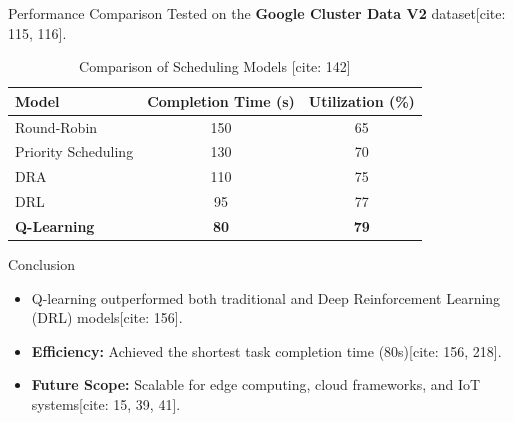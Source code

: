 \documentclass{beamer}
\begin{document}
\begin{frame}{Performance Comparison}
    Tested on the \textbf{Google Cluster Data V2} dataset[cite: 115, 116].
    \begin{table}
        \centering
        \begin{tabular}{|l|c|c|}
            \hline
            \textbf{Model} & \textbf{Completion Time (s)} & \textbf{Utilization (\%)} \\
            \hline
            Round-Robin & 150 & 65 \\
            Priority Scheduling & 130 & 70 \\
            DRA & 110 & 75 \\
            DRL & 95 & 77 \\
            \textbf{Q-Learning} & \textbf{80} & \textbf{79} \\
            \hline
        \end{tabular}
        \caption{Comparison of Scheduling Models [cite: 142]}
    \end{table}
\end{frame}

\begin{frame}{Conclusion}
    \begin{itemize}
        \item Q-learning outperformed both traditional and Deep Reinforcement Learning (DRL) models[cite: 156].
        \item \textbf{Efficiency:} Achieved the shortest task completion time (80s)[cite: 156, 218].
        \item \textbf{Future Scope:} Scalable for edge computing, cloud frameworks, and IoT systems[cite: 15, 39, 41].
    \end{itemize}
\end{frame}
\end{document}
